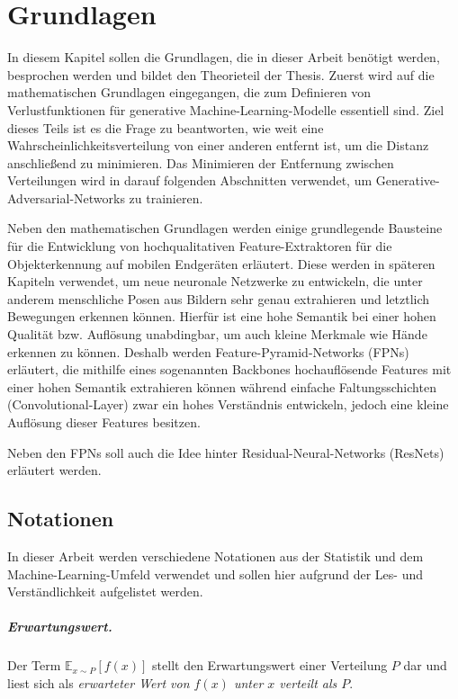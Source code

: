 \chapter{Grundlagen}\label{chapter:basics}
In diesem Kapitel sollen die Grundlagen, die in dieser Arbeit benötigt werden, besprochen werden und bildet den Theorieteil der Thesis. Zuerst wird auf die mathematischen Grundlagen eingegangen, die zum Definieren von Verlustfunktionen für generative Machine-Learning-Modelle essentiell sind. Ziel dieses Teils ist es die Frage zu beantworten, wie weit eine Wahrscheinlichkeitsverteilung von einer anderen entfernt ist, um die Distanz anschließend zu minimieren. Das Minimieren der Entfernung zwischen Verteilungen wird in darauf folgenden Abschnitten verwendet, um Generative-Adversarial-Networks zu trainieren.

Neben den mathematischen Grundlagen werden einige grundlegende Bausteine für die
Entwicklung von hochqualitativen Feature-Extraktoren für die Objekterkennung auf
mobilen Endgeräten erläutert. Diese werden in späteren Kapiteln verwendet, um
neue neuronale Netzwerke zu entwickeln, die unter anderem menschliche Posen aus
Bildern sehr genau extrahieren und letztlich Bewegungen erkennen können. Hierfür
ist eine hohe Semantik bei einer hohen Qualität bzw. Auflösung unabdingbar, um
auch kleine Merkmale wie Hände erkennen zu können. Deshalb werden
Feature-Pyramid-Networks (FPNs) erläutert, die mithilfe eines sogenannten
Backbones hochauflösende Features mit einer hohen Semantik extrahieren können
während einfache Faltungsschichten (Convolutional-Layer) zwar ein hohes
Verständnis entwickeln, jedoch eine kleine Auflösung dieser Features besitzen.

Neben den FPNs soll auch die Idee hinter Residual-Neural-Networks (ResNets) erläutert werden.

\section{Notationen}
In dieser Arbeit werden verschiedene Notationen aus der Statistik und dem
Machine-Learning-Umfeld verwendet und sollen hier aufgrund der Les- und
Verständlichkeit aufgelistet werden.

\paragraph{Erwartungswert.}
Der Term $\mathbb{E}_{x \sim P}\left[f(x)\right]$ stellt den Erwartungswert
einer Verteilung $P$ dar und liest sich als \textit{erwarteter Wert von
$f(x)$ unter $x$ verteilt als $P$}.


